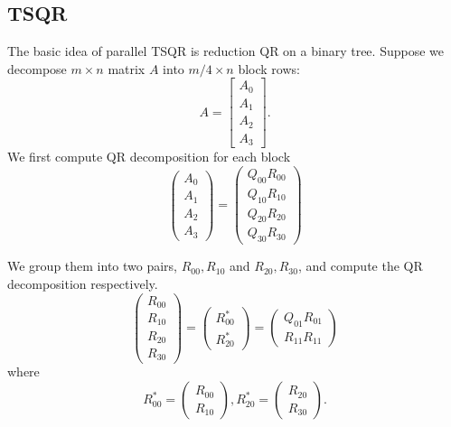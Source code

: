 \documentclass{article}
\begin{document}
\subsection{TSQR}
The basic idea of parallel TSQR is reduction QR on a binary tree. Suppose we decompose $m\times n$ matrix $A$ into $m/4 \times n$ block rows:
$$A = \begin{bmatrix}
A_0\\A_1\\A_2\\A_3
\end{bmatrix}.$$
We first compute QR decomposition for each block \begin{equation}\left(\begin{array}{c}
A_{0} \\
A_{1} \\
A_{2} \\
A_{3}
\end{array}\right)=\left(\begin{array}{l}
Q_{00} R_{00} \\
Q_{10} R_{10} \\
Q_{20} R_{20} \\
Q_{30} R_{30}
\end{array}\right)\end{equation}

We group them into two pairs, $R_{00}, R_{10}$ and $R_{20}, R_{30}$, and compute the QR decomposition respectively.
\begin{equation}\left(\begin{array}{c}
R_{00} \\
R_{10} \\
\hline R_{20} \\
R_{30}
\end{array}\right)=\left(\begin{array}{c}
R_{00}^* \\
R_{20}^*
\end{array}\right)=\left(\begin{array}{c}
Q_{01} R_{01} \\
\hline R_{11} R_{11}
\end{array}\right)\end{equation}
where $$R_{00}^* = \left(\begin{array}{c}
R_{00} \\
R_{10} \end{array} \right), R_{20}^* =  \left(\begin{array}{c}
R_{20} \\
R_{30} \end{array} \right).$$
\end{document}
